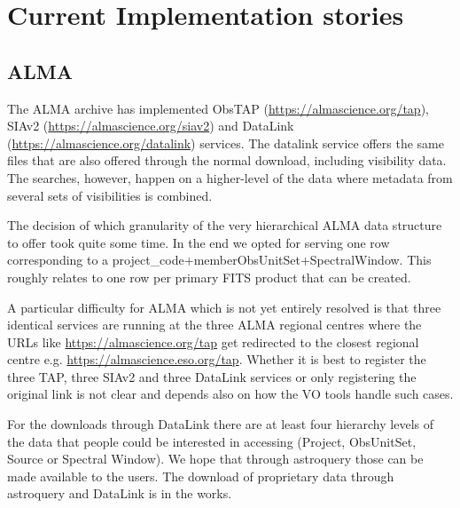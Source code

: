 \documentclass[11pt,a4paper]{ivoa}
\begin{document}
%



\appendix
\section{ Current Implementation stories}

\subsection{ALMA}
\label{sec:ALMA}
The ALMA archive has implemented ObsTAP (\url{https://almascience.org/tap}), SIAv2 (\url{https://almascience.org/siav2}) and DataLink (\url{https://almascience.org/datalink}) services.
The datalink service offers the same files that are also offered through the normal download, including visibility data. The searches, however,
happen on a higher-level of the data where metadata from several sets of visibilities is combined.

The decision of which granularity of the very hierarchical ALMA data
structure to offer took quite some time. In the end we opted for serving
one row corresponding to a project\_code$+$memberObsUnitSet$+$SpectralWindow. This roughly relates to one row per primary FITS product that can be created.

A particular difficulty for ALMA which is not yet entirely resolved is that three identical services are running at the three ALMA regional centres where the URLs like \url{https://almascience.org/tap} get redirected
to the closest regional centre e.g. \url{https://almascience.eso.org/tap}.
Whether it is best to register the three TAP, three SIAv2 and three DataLink services or only registering the original link is not clear and
depends also on how the VO tools handle such cases.

For the downloads through DataLink there are at least four hierarchy
levels of the data that people could be interested in accessing (Project, ObsUnitSet, Source or Spectral Window). We hope that through astroquery those can be made available to the users. The download of proprietary data through astroquery and DataLink is in
the works.
\end{document}
